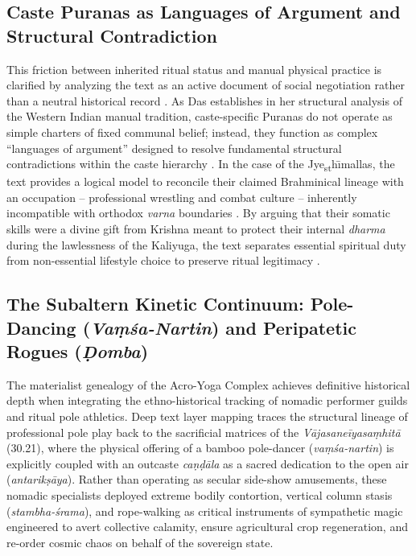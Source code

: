 \documentclass[11pt,twoside,letterpaper]{article}
\begin{document}
\subsection{Caste Puranas as Languages of Argument and Structural Contradiction}
This friction between inherited ritual status and manual physical practice is clarified by analyzing the text as an active document of social negotiation rather than a neutral historical record \cite{Das1968}. As Das establishes in her structural analysis of the Western Indian manual tradition, caste-specific Puranas do not operate as simple charters of fixed communal belief; instead, they function as complex ``languages of argument'' designed to resolve fundamental structural contradictions within the caste hierarchy \cite{Das1968}. In the case of the Jye\textsubscript{s}\textsubscript{t}h\={\i}mallas, the text provides a logical model to reconcile their claimed Brahminical lineage with an occupation -- professional wrestling and combat culture -- inherently incompatible with orthodox \textit{varna} boundaries \cite{Das1968}. By arguing that their somatic skills were a divine gift from Krishna meant to protect their internal \textit{dharma} during the lawlessness of the Kaliyuga, the text separates essential spiritual duty from non-essential lifestyle choice to preserve ritual legitimacy \cite{Das1968}.

\subsection{The Subaltern Kinetic Continuum: Pole-Dancing (\textit{Vaṃśa-Nartin}) and Peripatetic Rogues (\textit{Ḍomba})}

The materialist genealogy of the Acro-Yoga Complex achieves definitive historical depth when integrating the ethno-historical tracking of nomadic performer guilds and ritual pole athletics. Deep text layer mapping traces the structural lineage of professional pole play back to the sacrificial matrices of the \textit{Vājasaneīyasaṃhitā} (30.21), where the physical offering of a bamboo pole-dancer (\textit{vaṃśa-nartin}) is explicitly coupled with an outcaste \textit{caṇḍāla} as a sacred dedication to the open air (\textit{antarikṣāya}). Rather than operating as secular side-show amusements, these nomadic specialists deployed extreme bodily contortion, vertical column stasis (\textit{stambha-śrama}), and rope-walking as critical instruments of sympathetic magic engineered to avert collective calamity, ensure agricultural crop regeneration, and re-order cosmic chaos on behalf of the sovereign state.
\end{document}
